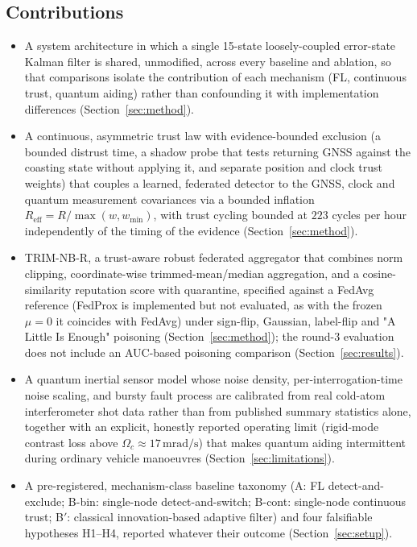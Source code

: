 \documentclass[journal]{IEEEtran}
\begin{document}
\subsection{Contributions}
\begin{itemize}
\item A system architecture in which a single 15-state loosely-coupled error-state Kalman filter is
  shared, unmodified, across every baseline and ablation, so that comparisons isolate the contribution
  of each mechanism (FL, continuous trust, quantum aiding) rather than confounding it with
  implementation differences (Section~\ref{sec:method}).
\item A continuous, asymmetric trust law with evidence-bounded exclusion (a bounded distrust time, a
  shadow probe that tests returning GNSS against the coasting state without applying it, and separate
  position and clock trust weights) that couples a learned, federated detector to the GNSS, clock and
  quantum measurement covariances via a bounded inflation $R_{\mathrm{eff}} = R / \max(w, w_{\min})$,
  with trust cycling bounded at $223$ cycles per hour independently of the timing of the evidence
  (Section~\ref{sec:method}).
\item TRIM-NB-R, a trust-aware robust federated aggregator that combines norm clipping, coordinate-wise
  trimmed-mean/median aggregation, and a cosine-similarity reputation score with quarantine, specified
  against a FedAvg reference (FedProx is implemented but not evaluated, as with the frozen $\mu=0$ it coincides with FedAvg) under sign-flip, Gaussian, label-flip and "A Little Is Enough"
  poisoning (Section~\ref{sec:method}); the round-3 evaluation does not include an AUC-based poisoning comparison (Section~\ref{sec:results}).
\item A quantum inertial sensor model whose noise density, per-interrogation-time noise scaling, and
  bursty fault process are calibrated from real cold-atom interferometer shot data
  \cite{darmagnac2024atom} rather than from published summary statistics alone, together with an
  explicit, honestly reported operating limit (rigid-mode contrast loss above
  $\Omega_c \approx 17\,\mathrm{mrad/s}$) that makes quantum aiding intermittent during ordinary vehicle
  manoeuvres (Section~\ref{sec:limitations}).
\item A pre-registered, mechanism-class baseline taxonomy (A: FL detect-and-exclude; B-bin: single-node
  detect-and-switch; B-cont: single-node continuous trust; B$'$: classical innovation-based adaptive
  filter) and four falsifiable hypotheses H1--H4, reported whatever their outcome
  (Section~\ref{sec:setup}).
\end{itemize}
\end{document}
